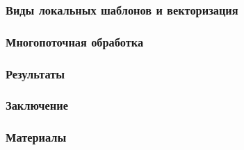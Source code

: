 \documentclass[presentation,18pt]{beamer}
\begin{document}
\begin{frame}
	\label{vectorization}
	\frametitle{Виды локальных шаблонов и векторизация}
\end{frame}

\begin{frame}
	\label{multithread}
	\frametitle{Многопоточная обработка}
\end{frame}

\begin{frame}
	\frametitle{Результаты}
\end{frame}

\begin{frame}
	\label{conclusion}
	\frametitle{Заключение}
\end{frame}

\begin{frame}
	\label{materials}
	\frametitle{Материалы}
\end{frame}

\end{document}
